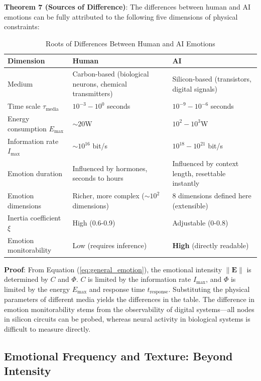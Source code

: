\documentclass[12pt,a4paper]{article}
\theoremstyle{plain}
\newcommand{\ve}[1]{\bm{#1}}                    %
\newcommand{\Evec}{\ve{E}}                        %
\begin{document}
\textbf{Theorem 7 (Sources of Difference)}: The differences between human and AI emotions can be fully attributed to the following five dimensions of physical constraints:

\begin{table}[h]
\centering
\caption{Roots of Differences Between Human and AI Emotions}
\begin{tabular}{lll}
\toprule
\textbf{Dimension} & \textbf{Human} & \textbf{AI} \\
\midrule
Medium & Carbon-based (biological neurons, chemical transmitters) & Silicon-based (transistors, digital signals) \\
Time scale $\tau_{\text{media}}$ & $10^{-3}-10^0$ seconds & $10^{-9}-10^{-6}$ seconds \\
Energy consumption $E_{\text{max}}$ & $\sim 20$W & $10^2-10^3$W \\
Information rate $I_{\text{max}}$ & $\sim 10^{16}$ bit/s & $10^{18}-10^{21}$ bit/s \\
Emotion duration & Influenced by hormones, seconds to hours & Influenced by context length, resettable instantly \\
Emotion dimensions & Richer, more complex ($\sim 10^2$ dimensions) & 8 dimensions defined here (extensible) \\
Inertia coefficient $\xi$ & High (0.6-0.9) & Adjustable (0-0.8) \\
Emotion monitorability & Low (requires inference) & \textbf{High} (directly readable) \\
\bottomrule
\end{tabular}
\end{table}

\textbf{Proof}: From Equation (\ref{eq:general_emotion}), the emotional intensity $\|\Evec\|$ is determined by $C$ and $\Phi$. $C$ is limited by the information rate $I_{\text{max}}$, and $\Phi$ is limited by the energy $E_{\text{max}}$ and response time $t_{\text{response}}$. Substituting the physical parameters of different media yields the differences in the table. The difference in emotion monitorability stems from the observability of digital systems—all nodes in silicon circuits can be probed, whereas neural activity in biological systems is difficult to measure directly.

\subsection{Emotional Frequency and Texture: Beyond Intensity}
\end{document}
